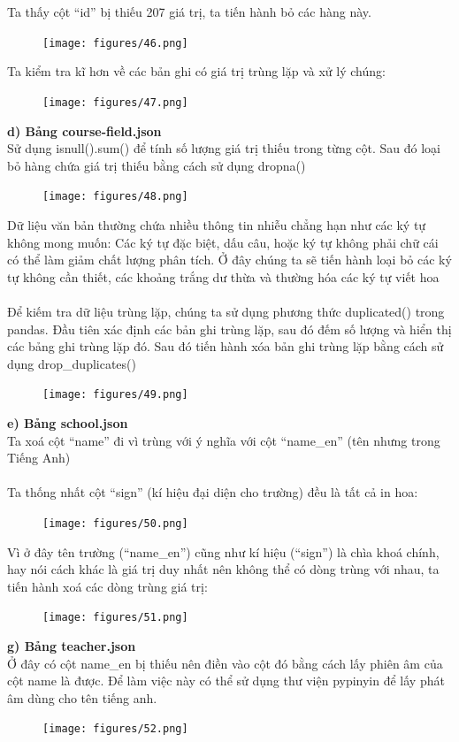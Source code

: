 Ta thấy cột “id” bị thiếu 207 giá trị, ta tiến hành bỏ các hàng này.\\
\begin{figure}[H]
    \centering
    \texttt{[image: figures/46.png]}
\end{figure}
\newpage
Ta kiểm tra kĩ hơn về các bản ghi có giá trị trùng lặp và xử lý chúng:\\
\begin{figure}[H]
    \centering
    \texttt{[image: figures/47.png]}
\end{figure}
\textbf{d) Bảng course-field.json}\\
Sử dụng isnull().sum() để tính số lượng giá trị thiếu trong từng cột. Sau đó loại bỏ hàng chứa giá trị thiếu bằng cách sử dụng dropna()
\newpage
\begin{figure}[H]
    \centering
    \texttt{[image: figures/48.png]}
\end{figure}
Dữ liệu văn bản thường chứa nhiều thông tin nhiễu chẳng hạn như các ký tự không mong muốn: Các ký tự đặc biệt, dấu câu, hoặc ký tự không phải chữ cái có thể làm giảm chất lượng phân tích. Ở đây chúng ta sẽ tiến hành loại bỏ các ký tự không cần thiết, các khoảng trắng dư thừa và thường hóa các ký tự viết hoa\\
\\
Để kiếm tra dữ liệu trùng lặp, chúng ta sử dụng phương thức duplicated() trong pandas. Đầu tiên xác định các bản ghi trùng lặp, sau đó đếm số lượng và hiển thị các bảng ghi trùng lặp đó. Sau đó tiến hành xóa bản ghi trùng lặp bằng cách sử dụng drop\_duplicates()
\newpage
\begin{figure}[H]
    \centering
    \texttt{[image: figures/49.png]}
\end{figure}
\textbf{e) Bảng school.json}\\
Ta xoá cột “name” đi vì trùng với ý nghĩa với cột “name\_en” (tên nhưng trong Tiếng Anh)\\
\\
Ta thống nhất cột “sign” (kí hiệu đại diện cho trường) đều là tất cả in hoa:
\newpage
\begin{figure}[H]
    \centering
    \texttt{[image: figures/50.png]}
\end{figure}
Vì ở đây tên trường (“name\_en”) cũng như kí hiệu (“sign”) là chìa khoá chính, hay nói cách khác là giá trị duy nhất nên không thể có dòng trùng với nhau, ta tiến hành xoá các dòng trùng giá trị:
\begin{figure}[H]
    \centering
    \texttt{[image: figures/51.png]}
\end{figure}
\textbf{g) Bảng teacher.json}\\
Ở đây có cột name\_en bị thiếu nên điền vào cột đó bằng cách lấy phiên âm của cột name là được. Để làm việc này có thể sử dụng thư viện pypinyin để lấy phát âm dùng cho tên tiếng anh.
\clearpage
\begin{figure}[H]
    \centering
    \texttt{[image: figures/52.png]}
\end{figure}

